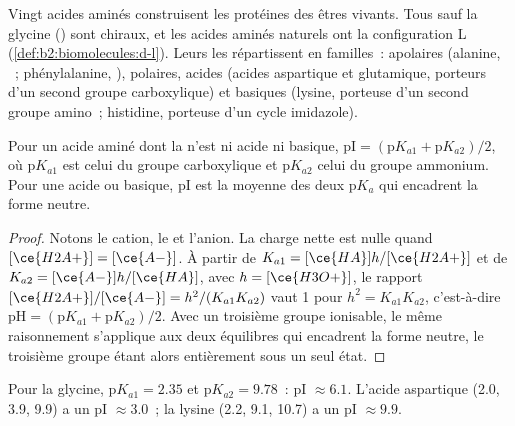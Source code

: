 Vingt acides aminés construisent les protéines des êtres vivants. Tous sauf la glycine () sont
chiraux, et les acides aminés naturels ont la configuration L (\cref{def:b2:biomolecules:d-l}). Leurs
 les répartissent en familles~: apolaires (alanine, ~; phénylalanine,
), polaires, acides (acides aspartique et glutamique, porteurs d'un second groupe
carboxylique) et basiques (lysine, porteuse d'un second groupe amino~; histidine, porteuse d'un cycle imidazole).

\begin{proposition}\label{prop:b2:biomolecules:pi}
Pour un acide aminé dont la  n'est ni acide ni basique, $\mathrm{pI} = (\mathrm pK_{a1} +
\mathrm pK_{a2})/2$, où $\mathrm pK_{a1}$ est celui du groupe carboxylique et $\mathrm pK_{a2}$ celui du
groupe ammonium. Pour une  acide ou basique, pI est la moyenne des deux $\mathrm pK_a$ qui
encadrent la forme neutre.
\end{proposition}

\begin{proof}
Notons  le cation,  le  et  l'anion. La charge nette est nulle quand
$[\ce{H2A+}] = [\ce{A-}]$. À partir de $K_{a1} = [\ce{HA}]h/[\ce{H2A+}]$ et de $K_{a2} =
[\ce{A-}]h/[\ce{HA}]$, avec $h = [\ce{H3O+}]$, le rapport $[\ce{H2A+}]/[\ce{A-}] = h^2/(K_{a1}K_{a2})$
vaut 1 pour $h^2 = K_{a1}K_{a2}$, c'est-à-dire $\mathrm{pH} = (\mathrm pK_{a1} + \mathrm pK_{a2})/2$. Avec
un troisième groupe ionisable, le même raisonnement s'applique aux deux équilibres qui encadrent la forme
neutre, le troisième groupe étant alors entièrement sous un seul état.
\end{proof}

Pour la glycine, $\mathrm pK_{a1} = 2.35$ et $\mathrm pK_{a2} = 9.78$~: pI $\approx 6.1$. L'acide aspartique
(2.0, 3.9, 9.9) a un pI $\approx 3.0$~; la lysine (2.2, 9.1, 10.7) a un pI $\approx 9.9$.

